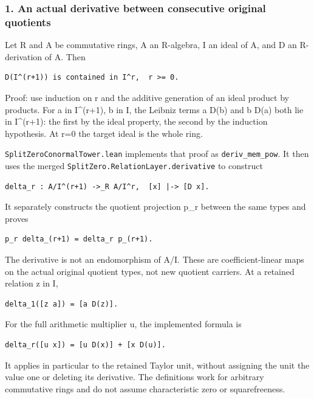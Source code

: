 \subsubsection{1. An actual derivative between consecutive original
quotients}\label{conormal_cyclic_pr21:an-actual-derivative-between-consecutive-original-quotients}

Let R and A be commutative rings, A an R-algebra, I an ideal of A, and D an R-derivation of A. Then

\begin{verbatim}
D(I^(r+1)) is contained in I^r,  r >= 0.
\end{verbatim}

Proof: use induction on r and the additive generation of an ideal product by products. For a in
I\^{}(r+1), b in I, the Leibniz terms a D(b) and b D(a) both lie in I\^{}(r+1): the first by the
ideal property, the second by the induction hypothesis. At r=0 the target ideal is the whole ring.

\nolinkurl{SplitZeroConormalTower.lean} implements that proof as \nolinkurl{deriv_mem_pow}. It then uses
the merged \nolinkurl{SplitZero.RelationLayer.derivative} to construct

\begin{verbatim}
delta_r : A/I^(r+1) ->_R A/I^r,  [x] |-> [D x].
\end{verbatim}

It separately constructs the quotient projection p\_r between the same types and proves

\begin{verbatim}
p_r delta_(r+1) = delta_r p_(r+1).
\end{verbatim}

The derivative is not an endomorphism of A/I. These are coefficient-linear maps on the actual
original quotient types, not new quotient carriers. At a retained relation z in I,

\begin{verbatim}
delta_1([z a]) = [a D(z)].
\end{verbatim}

For the full arithmetic multiplier u, the implemented formula is

\begin{verbatim}
delta_r([u x]) = [u D(x)] + [x D(u)].
\end{verbatim}

It applies in particular to the retained Taylor unit, without assigning the unit the value one or
deleting its derivative. The definitions work for arbitrary commutative rings and do not assume
characteristic zero or squarefreeness.

